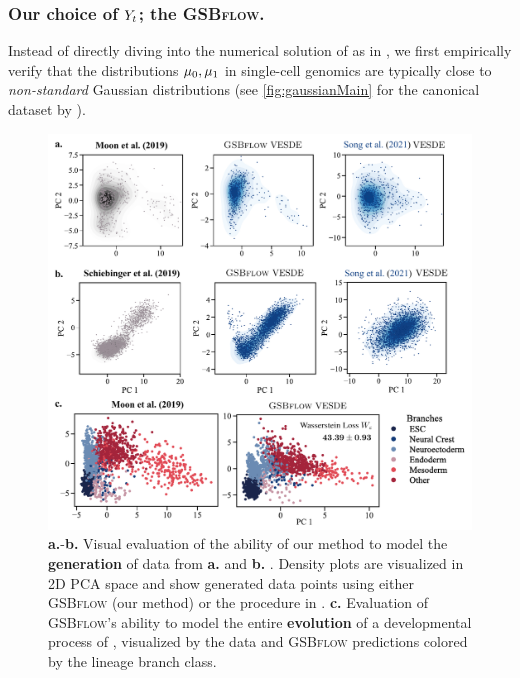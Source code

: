 \subsubsection*{Our choice of $Y_{ t }$; the \textsc{GSBflow}.}

Instead of directly diving into the numerical solution of  as in \citet{chen2021likelihood}, we first empirically verify that the distributions $\mu_0,\mu_1$ in single-cell genomics are typically close to \emph{non-standard} Gaussian distributions (see \cref{fig:gaussianMain} for the canonical dataset by \citet{schiebinger2019optimal}). 

\begin{figure}
     \centering
     \includegraphics[width=\textwidth]{figures/fig_all_predictions.pdf}
    \caption{\textbf{a.}-\textbf{b.} Visual evaluation of the ability of our method to model the \textbf{generation} of data from \textbf{a.} \citet{moon2019visualizing} and \textbf{b.} \citet{schiebinger2019optimal}. Density plots are visualized in 2D PCA space and show generated data points using either \textsc{GSBflow} (our method) or the procedure in \citet{song2020score}. \textbf{c.} Evaluation of \textsc{GSBflow}'s ability to model the entire \textbf{evolution} of a developmental process of \citet{moon2019visualizing}, visualized by the data and \textsc{GSBflow} predictions colored by the lineage branch class.}
    \label{fig:all_results}
\end{figure}

